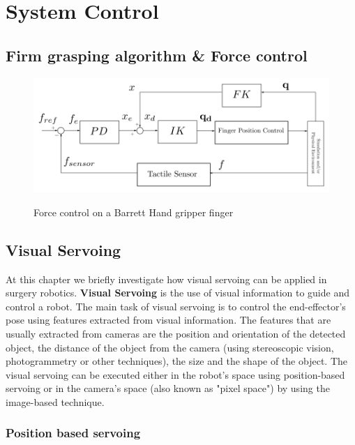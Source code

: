 \chapter{System Control}

\section{Firm grasping algorithm \& Force control}

\begin{center}
\begin{figure}[H]
\centering
\includegraphics[width=12cm]{images/finger-force-control.png}\\
\caption{Force control on a Barrett Hand gripper finger}
\end{figure}
\end{center}

\section{Visual Servoing}

At this chapter we briefly investigate how visual servoing can be applied in surgery robotics. \textbf{Visual Servoing} is the use of visual information 
to guide and control a robot. The main task of visual servoing is to control the end-effector's pose using features extracted from visual information. The 
features that are usually extracted from cameras are the position and orientation of the detected object, the distance of the object from the camera (using 
stereoscopic vision, photogrammetry or other techniques), the size and the shape of the object. The visual servoing can be executed either in the robot's space 
using position-based servoing or in the camera's space (also known as "pixel space") by using the image-based technique.

\subsection{Position based servoing}

